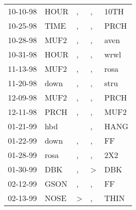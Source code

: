 \begin{supertabular}{p{0.07\textwidth}p{0.06\textwidth}p{0.02\textwidth}p{0.02\textwidth}p{0.06\textwidth}}
          10-10-98\textsuperscript{} &           HOUR\textsuperscript{} &                , &                , &           10TH\textsuperscript{} \\
          10-25-98\textsuperscript{} &           TIME\textsuperscript{} &                , &                , &           PRCH\textsuperscript{} \\
          10-28-98\textsuperscript{} &           MUF2\textsuperscript{} &                , &                , &           aven\textsuperscript{} \\
          10-31-98\textsuperscript{} &           HOUR\textsuperscript{} &                , &                , &           wrwl\textsuperscript{} \\
          11-13-98\textsuperscript{} &           MUF2\textsuperscript{} &                , &                , &           rosa\textsuperscript{} \\
          11-20-98\textsuperscript{} &           down\textsuperscript{} &                , &                , &           stru\textsuperscript{} \\
          12-09-98\textsuperscript{} &           MUF2\textsuperscript{} &                , &                , &           PRCH\textsuperscript{} \\
          12-11-98\textsuperscript{} &           PRCH\textsuperscript{} &                , &                , &           MUF2\textsuperscript{} \\
          01-21-99\textsuperscript{} &            hbd\textsuperscript{} &                  &                , &           HANG\textsuperscript{} \\
          01-22-99\textsuperscript{} &           down\textsuperscript{} &                , &                , &             FF\textsuperscript{} \\
          01-28-99\textsuperscript{} &           rosa\textsuperscript{} &                , &                , &            2X2\textsuperscript{} \\
          01-30-99\textsuperscript{} &            DBK\textsuperscript{} &                , &     \textgreater &            DBK\textsuperscript{} \\
          02-12-99\textsuperscript{} &           GSON\textsuperscript{} &                , &                , &             FF\textsuperscript{} \\
          02-13-99\textsuperscript{} &           NOSE\textsuperscript{} &     \textgreater &                , &           THIN\textsuperscript{} \\

\end{supertabular}
